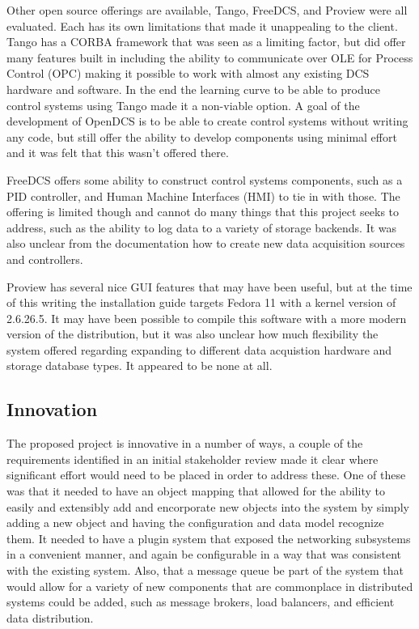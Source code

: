     Other open source offerings are available, Tango, FreeDCS, and Proview were
    all evaluated. Each has its own limitations that made it unappealing to the
    client. Tango has a CORBA framework that was seen as a limiting factor, but
    did offer many features built in including the ability to communicate over
    OLE for Process Control (OPC) making it possible to work with almost any
    existing DCS hardware and software. In the end the learning curve to be
    able to produce control systems using Tango made it a non-viable option. A
    goal of the development of OpenDCS is to be able to create control systems
    without writing any code, but still offer the ability to develop components
    using minimal effort and it was felt that this wasn't offered there.

    FreeDCS offers some ability to construct control systems components, such
    as a PID controller, and Human Machine Interfaces (HMI) to tie in with
    those.  The offering is limited though and cannot do many things that this
    project seeks to address, such as the ability to log data to a variety of
    storage backends. It was also unclear from the documentation how to create
    new data acquisition sources and controllers.

    Proview has several nice GUI features that may have been useful, but at the
    time of this writing the installation guide targets Fedora 11 with a kernel
    version of 2.6.26.5. It may have been possible to compile this software
    with a more modern version of the distribution, but it was also unclear how
    much flexibility the system offered regarding expanding to different data
    acquistion hardware and storage database types. It appeared to be none at
    all.

  \subsection{Innovation}\label{sec:desc-innovation}

    The proposed project is innovative in a number of ways, a couple of the
    requirements identified in an initial stakeholder review made it clear where
    significant effort would need to be placed in order to address these. One of
    these was that it needed to have an object mapping that allowed for the
    ability to easily and extensibly add and encorporate new objects into the
    system by simply adding a new object and having the configuration and data
    model recognize them. It needed to have a plugin system that exposed the
    networking subsystems in a convenient manner, and again be configurable in a
    way that was consistent with the existing system. Also, that a message queue
    be part of the system that would allow for a variety of new components that
    are commonplace in distributed systems could be added, such as message
    brokers, load balancers, and efficient data distribution.

